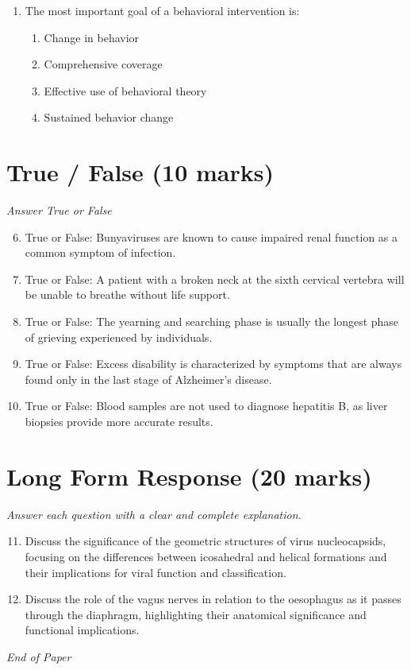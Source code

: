 \documentclass[12pt]{article}
\begin{document}
\begin{enumerate}[label=\arabic*.]
\begin{enumerate}[label=(\alph*)]
    \item Vaccine has been developed
    \item A range of new antivirals
    \item Social distancing
\end{enumerate}
\item The most important goal of a behavioral intervention is:
\begin{enumerate}[label=(\alph*)]
    \item Change in behavior
    \item Comprehensive coverage
    \item Effective use of behavioral theory
    \item Sustained behavior change
\end{enumerate}
\end{enumerate}

\section*{True / False (10 marks)}
\textit{Answer True or False}
\begin{enumerate}[label=\arabic*.]
\setcounter{enumi}{5}
\item True or False: Bunyaviruses are known to cause impaired renal function as a common symptom of infection.
\item True or False: A patient with a broken neck at the sixth cervical vertebra will be unable to breathe without life support.
\item True or False: The yearning and searching phase is usually the longest phase of grieving experienced by individuals.
\item True or False: Excess disability is characterized by symptoms that are always found only in the last stage of Alzheimer's disease.
\item True or False: Blood samples are not used to diagnose hepatitis B, as liver biopsies provide more accurate results.
\end{enumerate}

\section*{Long Form Response (20 marks)}
\textit{Answer each question with a clear and complete explanation.}
\begin{enumerate}[label=\arabic*.]
\setcounter{enumi}{10}
\item Discuss the significance of the geometric structures of virus nucleocapsids, focusing on the differences between icosahedral and helical formations and their implications for viral function and classification.
\item Discuss the role of the vagus nerves in relation to the oesophagus as it passes through the diaphragm, highlighting their anatomical significance and functional implications.
\end{enumerate}

\vfill
\noindent\textit{End of Paper}
\end{document}
